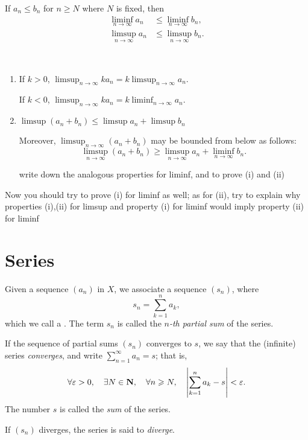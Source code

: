 \begin{proposition}\label{prop:limsup-liminf-comp}
If $a_n\le b_n$ for $n\ge N$ where $N$ is fixed, then
\begin{align*}
\liminf_{n\to\infty}a_n&\le\liminf_{n\to\infty}b_n,\\
\limsup_{n\to\infty}a_n&\le\limsup_{n\to\infty}b_n.
\end{align*}
\end{proposition}

\begin{proposition} \
\begin{enumerate}[label=(\roman*)]
\item If $k>0$, $\displaystyle\limsup_{n\to\infty}ka_n=k\limsup_{n\to\infty}a_n$.

If $k<0$, $\displaystyle\limsup_{n\to\infty}ka_n=k\liminf_{n\to\infty}a_n$.

\item $\displaystyle\limsup(a_n+b_n)\le\limsup a_n+\limsup b_n$

Moreover, $\displaystyle\limsup_{n\to\infty}(a_n+b_n)$ may be bounded from below as follows:
\[ \limsup_{n\to\infty}(a_n+b_n)\ge\limsup_{n\to\infty}a_n+\liminf_{n\to\infty}b_n.\]

write down the analogous properties for liminf, and to prove (i) and (ii)
\end{enumerate}
\end{proposition}

Now you should try to prove (i) for liminf as well; as for (ii), try to explain why properties (i),(ii) for limsup and property (i) for liminf would imply property (ii) for liminf

\section{Series}
\begin{definition}[Series]
Given a sequence $(a_n)$ in $X$, we associate a sequence $(s_n)$, where
\[s_n=\sum_{k=1}^n a_k,\]
which we call a . The term $s_n$ is called the \emph{$n$-th partial sum} of the series.

If the sequence of partial sums $(s_n)$ converges to $s$, we say that the (infinite) series \emph{converges}, and write $\displaystyle\sum_{n=1}^\infty a_n=s$; that is,
\[\forall\varepsilon>0,\quad\exists N\in\mathbf N,\quad\forall n\geqslant N,\quad\left|\sum_{k=1}^n a_k-s\right|<\varepsilon.\]
The number $s$ is called the \emph{sum} of the series.

If $(s_n)$ diverges, the series is said to \emph{diverge}.
\end{definition}

